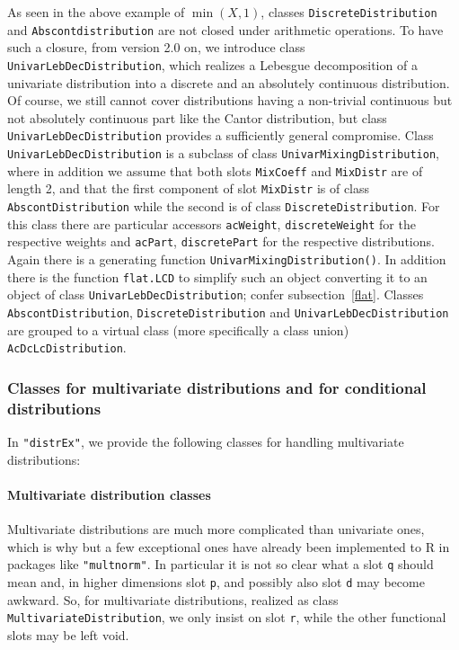 \documentclass[11pt]{article}
\newcommand{\code}[1]{{\tt #1}}
\newcommand{\pkg}[1]{{\tt "#1"}}
\begin{document}
As seen in the above example of $\min(X,1)$, classes \code{DiscreteDistribution}
and \code{Abscontdistribution} are not closed under arithmetic operations. To
have such a closure, from version 2.0 on, we introduce class
\code{UnivarLebDecDistribution}, which realizes a Lebesgue decomposition of a
univariate distribution into a discrete and an absolutely continuous distribution.
Of course, we still cannot cover distributions having a non-trivial continuous
but not absolutely continuous part like the Cantor distribution, but class
\code{UnivarLebDecDistribution} provides a sufficiently general compromise.
Class \code{UnivarLebDecDistribution} is a subclass of class
\code{UnivarMixingDistribution}, where in addition we assume that both slots
\code{MixCoeff} and \code{MixDistr} are of length 2, and that the first component
of slot  \code{MixDistr} is of class \code{AbscontDistribution} while the second
is of class \code{DiscreteDistribution}. For this class there are particular
accessors \code{acWeight}, \code{discreteWeight} for the respective weights and
\code{acPart}, \code{discretePart} for the respective distributions. Again there
is a generating function \code{UnivarMixingDistribution()}.
In addition there is the function \code{flat.LCD}
to simplify such an object converting it to an object of class
\code{UnivarLebDecDistribution}; confer subsection~\ref{flat}.%
Classes \code{AbscontDistribution}, \code{DiscreteDistribution} and
\code{UnivarLebDecDistribution}  are grouped to a virtual class
(more specifically a class union)
\code{AcDcLcDistribution}.

\subsubsection{Classes for multivariate distributions and for conditional
distributions}

In \pkg{distrEx}, we provide the following classes for handling multivariate
distributions:


\paragraph{Multivariate distribution classes}

Multivariate distributions are much more complicated than univariate ones,
which is why but a few exceptional ones have already been implemented to R in
packages like \pkg{multnorm}. In particular it is not so clear what a slot
\code{q} should mean and, in higher dimensions slot \code{p}, and possibly also
slot \code{d} may become awkward. So, for multivariate distributions, realized
as class \code{MultivariateDistribution}, we only insist on slot \code{r}, while
the other functional slots may be left void.
\end{document}
